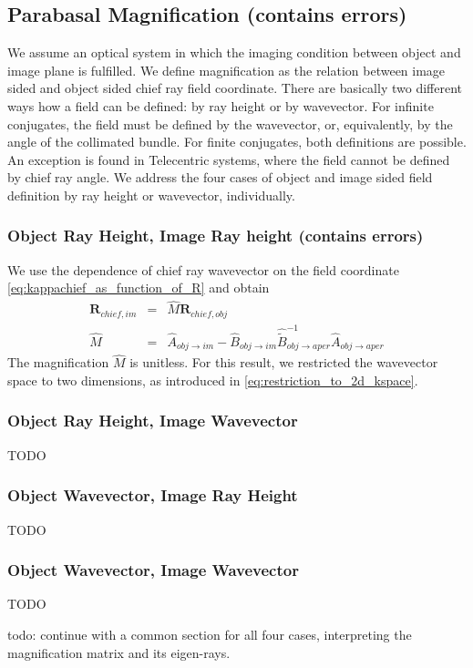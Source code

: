 \documentclass[12pt,a4paper,twoside,openright,BCOR10mm,headsepline,titlepage,abstracton,chapterprefix,final]{scrreprt}
\newcommand\Vector[1]{{\mathbf{#1}}}
\begin{document}
\subsection{Parabasal Magnification (contains errors)}
We assume an optical system in which the imaging condition between object and image plane is fulfilled.
We define magnification as the relation between image sided and object sided chief ray field coordinate.
There are basically two different ways how a field can be defined: by ray height or by wavevector.
For infinite conjugates, the field must be defined by the wavevector, or, equivalently, by the angle of the collimated bundle.
For finite conjugates, both definitions are possible.
An exception is found in Telecentric systems, where the field cannot be defined by chief ray angle.
We address the four cases of object and image sided field definition by ray height or wavevector, individually.

\subsubsection{Object Ray Height, Image Ray height (contains errors)}
We use the dependence of chief ray wavevector on the field coordinate \eqref{eq:kappachief_as_function_of_R} and obtain
\begin{eqnarray}
 \Vector{R}_{chief, im} &=& \hat{M} \Vector{R}_{chief, obj} \\
 \hat{M} &=& \hat{A}_{obj\rightarrow im} - \hat{B}_{obj\rightarrow im} \hat{\tilde{B}}^{-1}_{obj\rightarrow aper} \hat{A}_{obj\rightarrow aper}
\end{eqnarray}
The magnification $\hat{M}$ is unitless. 
For this result, we restricted the wavevector space to two dimensions, as introduced in \eqref{eq:restriction_to_2d_kspace}.

\subsubsection{Object Ray Height, Image Wavevector}
TODO
\subsubsection{Object Wavevector, Image Ray Height}
TODO
\subsubsection{Object Wavevector, Image Wavevector}
TODO

todo: continue with a common section for all four cases, interpreting the magnification matrix and its eigen-rays.
\end{document}
